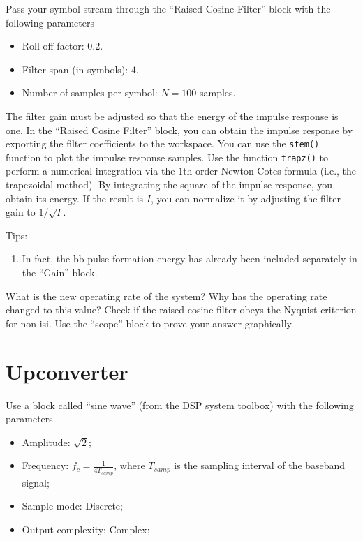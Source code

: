 \documentclass[12pt,a4paper]{article}
\begin{document}
\problem Pass your symbol stream through the ``Raised Cosine Filter'' block with the following parameters
\begin{itemize}
    \item Roll-off factor: \(0.2\).
    \item Filter span (in symbols): \(4\).
    \item Number of samples per symbol: \(N=100\) samples.
\end{itemize}
The filter gain must be adjusted so that the energy of the impulse response is one. In the ``Raised Cosine Filter'' block, you can obtain the impulse response by exporting the filter coefficients to the workspace. You can use the \texttt{stem()} function to plot the impulse response samples. Use the function \texttt{trapz()} to perform a numerical integration via the \(1\)th-order Newton-Cotes formula (i.e., the trapezoidal method). By integrating the square of the impulse response, you obtain its energy. If the result is \(I\), you can normalize it by adjusting the filter gain to \(1/\sqrt{I}\).

Tips:
\begin{enumerate}
    \item In fact, the \gls{bb} pulse formation energy has already been included separately in the ``Gain'' block.
\end{enumerate}
\subproblem What is the new operating rate of the system? Why has the operating rate changed to this value?
\subproblem Check if the raised cosine filter obeys the Nyquist criterion for non-\gls{isi}. Use the ``scope'' block to prove your answer graphically.

\section{Upconverter}

\problem Use a block called ``sine wave'' (from the DSP system toolbox) with the following parameters
\begin{itemize}
    \item Amplitude: \(\sqrt{2}\);
    \item Frequency: \(f_c = \frac{1}{4T_{samp}}\), where \(T_{samp}\) is the sampling interval of the baseband signal;
    \item Sample mode: Discrete;
    \item Output complexity: Complex;
\end{itemize}
\end{document}
